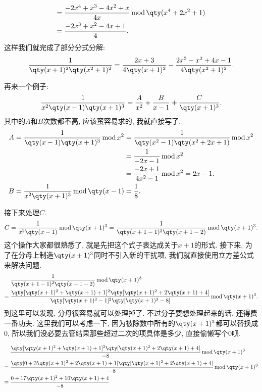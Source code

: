 \documentclass{ctexbook}
\newcommand{\m}{\,\mathrm{mod}\,}
\begin{document}
{\begin{align*}
={}&\frac{-2x^{4}+x^{3}-4x^{2}+x}{4x}\m\qty(x^{4}+2x^{2}+1)\\
={}&\frac{-2x^{3}+x^{2}-4x+1}{4}
.\end{align*}
这样我们就完成了部分分式分解: 
\begin{align*}
\frac{1}{\qty(x+1)^{2}\qty(x^{2}+1)^{2}}=\frac{2x+3}{4\qty(x+1)^{2}}-\frac{2x^{3}-x^{2}+4x-1}{4\qty(x^{2}+1)^{2}}
.\end{align*}\par
再来一个例子: 
\begin{align*}
\frac{1}{x^{2}\qty(x-1)\qty(x+1)^{3}}=\frac{A}{x^{2}}+\frac{B}{x-1}+\frac{C}{\qty(x+1)^{3}}
.\end{align*}
其中的$A$和$B$次数都不高, 应该蛮容易求的, 我就直接写了. 
\begin{align*}
A=\frac{1}{\qty(x-1)\qty(x+1)^{3}}\m x^{2}={}&\frac{1}{\qty(x^{2}-1)\qty(x^{2}+2x+1)}\m x^{2}\\
={}&\frac{1}{-2x-1}\m x^{2}\\
={}&\frac{-2x+1}{4x^{2}-1}\m x^{2}=2x-1.\\
B=\frac{1}{x^{2}\qty(x+1)^{3}}\m\qty(x-1)={}&\frac{1}{8}
.\end{align*}\par
接下来处理$C$. 
\begin{align*}
C=\frac{1}{x^{2}\qty(x-1)}\m\qty(x+1)^{3}=\frac{1}{\qty(x+1-1)^{2}\qty(x+1-2)}\m\qty(x+1)^{3}
.\end{align*}
这个操作大家都很熟悉了, 就是先把这个式子表达成关于$x+1$的形式. 接下来, 为了在分母上制造$\qty(x+1)^{3}$同时不引入新的干扰项, 我们就直接使用立方差公式来解决问题. 
\begin{align*}
{}&\frac{1}{\qty(x+1-1)^{2}\qty(x+1-2)}\m\qty(x+1)^{3}\\
={}&\frac{\qty[\qty(x+1)^{2}+\qty(x+1)+1]^{2}\qty[\qty(x+1)^{2}+2\qty(x+1)+4]}{\qty[\qty(x+1)^{3}-1]^{2}\qty[\qty(x+1)^{3}-8]}\m\qty(x+1)^{3}
.\end{align*}
到这里可以发现, 分母很容易就可以处理掉了. 不过分子要想处理起来的话, 还得费一番功夫. 这里我们可以考虑一下, 因为被除数中所有的$\qty(x+1)^{3}$都可以替换成$0$, 所以我们没必要去管结果那些超过二次的项具体是多少, 直接偷懒写个$0$呗. \par
\begin{align*}
{}&\frac{\qty[\qty(x+1)^{2}+\qty(x+1)+1]^{2}\qty[\qty(x+1)^{2}+2\qty(x+1)+4]}{-8}\m\qty(x+1)^{3}\\
={}&\frac{\qty[0+3\qty(x+1)^{2}+2\qty(x+1)+1]\qty[\qty(x+1)^{2}+2\qty(x+1)+4]}{-8}\m\qty(x+1)^{3}\\
={}&\frac{0+17\qty(x+1)^{2}+10\qty(x+1)+4}{-8}\\

\end{align*}}
\end{document}
